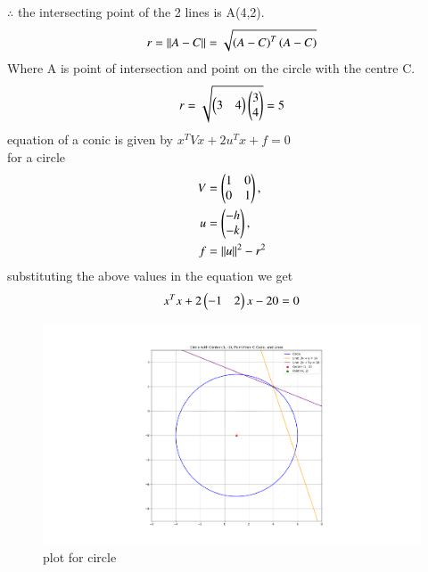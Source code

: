 \documentclass[journal]{IEEEtran}
\begin{document}
$\therefore$ the intersecting point of the 2 lines is A(4,2).\\
\begin{align*}
	r = \left\lVert A-C\right\rVert = \sqrt{\left(A-C\right)^T\left(A-C\right)} 
\end{align*}
Where A is point of intersection and point on the circle with the centre C.
\begin{align*}
	r = \sqrt{\begin{pmatrix}3 & 4\end{pmatrix}\begin{pmatrix}3\\4\end{pmatrix}} = 5
\end{align*}
equation of a conic is given by  $x^TVx + 2u^Tx + f = 0$\\
 for a circle
\begin{align*}
 V &= \begin{pmatrix}1&0\\0&1\end{pmatrix},\\ 
u&=\begin{pmatrix}-h\\-k\end{pmatrix}, \\
f &= \left\lVert u\right\rVert^2 - r^2\\
\end{align*}
substituting the above values in the equation we get 
\begin{align*}
x^Tx + 2\begin{pmatrix}-1 & 2\end{pmatrix}x - 20 = 0
\end{align*}
\begin{figure}[h!]
\centering
\includegraphics[width=0.7\columnwidth]{figs/Figure_1.png}
\caption{plot for circle}
 \label{fig. 7-7.2-22.1}
\end{figure}
\end{document}

